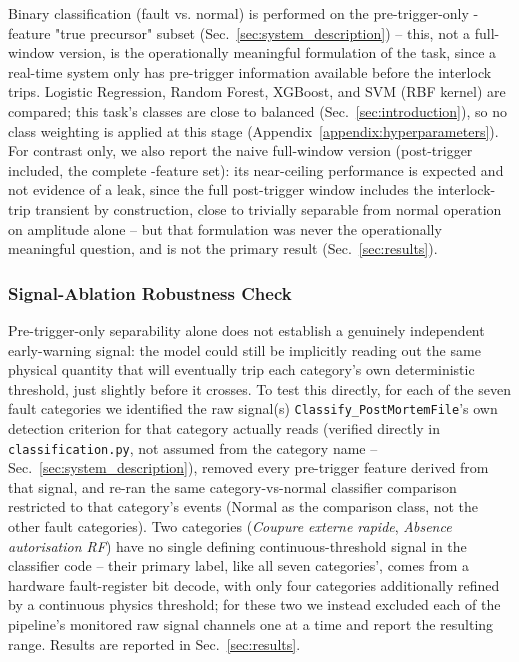 Binary classification (fault vs. normal) is performed on the pre-trigger-only \MetricZeroFivePhaseZeroPrecursorNFeatures{}-feature "true precursor" subset (Sec.~\ref{sec:system_description}) -- this, not a full-window version, is the operationally meaningful formulation of the task, since a real-time system only has pre-trigger information available before the interlock trips. Logistic Regression, Random Forest, XGBoost, and SVM (RBF kernel) are compared; this task's classes are close to balanced (Sec.~\ref{sec:introduction}), so no class weighting is applied at this stage (Appendix~\ref{appendix:hyperparameters}). For contrast only, we also report the naive full-window version (post-trigger included, the complete \MetricZeroSixBinaryClassificationNFeatures{}-feature set): its near-ceiling performance is expected and not evidence of a leak, since the full post-trigger window includes the interlock-trip transient by construction, close to trivially separable from normal operation on amplitude alone -- but that formulation was never the operationally meaningful question, and is not the primary result (Sec.~\ref{sec:results}).

\subsubsection{Signal-Ablation Robustness Check}
\label{sec:signal_ablation}

Pre-trigger-only separability alone does not establish a genuinely independent early-warning signal: the model could still be implicitly reading out the same physical quantity that will eventually trip each category's own deterministic threshold, just slightly before it crosses. To test this directly, for each of the seven fault categories we identified the raw signal(s) \texttt{Classify\_PostMortemFile}'s own detection criterion for that category actually reads (verified directly in \texttt{classification.py}, not assumed from the category name -- Sec.~\ref{sec:system_description}), removed every pre-trigger feature derived from that signal, and re-ran the same category-vs-normal classifier comparison restricted to that category's events (Normal as the comparison class, not the other fault categories). Two categories (\textit{Coupure externe rapide}, \textit{Absence autorisation RF}) have no single defining continuous-threshold signal in the classifier code -- their primary label, like all seven categories', comes from a hardware fault-register bit decode, with only four categories additionally refined by a continuous physics threshold; for these two we instead excluded each of the pipeline's monitored raw signal channels one at a time %
and report the resulting range. Results are reported in Sec.~\ref{sec:results}.

